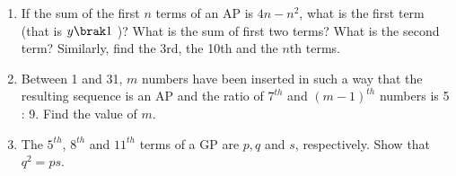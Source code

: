 \begin{enumerate}[label=\thesubsection.\arabic*, ref=\thesubsection.\theenumi]
\item If the sum of the first $n$ terms of an AP is $4n - n^2$,  what is the first term (that is $y\brak 1$ )? What
is the sum of first two terms? What is the second term? Similarly,  find the 3rd,  the 10th and
the $n$th terms.
\item Between 1 and 31,  $m$ numbers have been inserted in such a way that the resulting sequence is an AP and the ratio of $7^{th}$ and $(m - 1)^{th}$ numbers is 5 : 9. Find the value of $m$.
\item The $5^{th}$, $8^{th}$ and $11^{th}$ terms of a GP  are $p, q$ and $s$, respectively. Show that 
$q^2 = ps$.
\end{enumerate}
